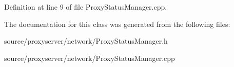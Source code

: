 Definition at line 9 of file Proxy\-Status\-Manager.\-cpp.



The documentation for this class was generated from the following files\-:\begin{DoxyCompactItemize}
\item 
source/proxyserver/network/Proxy\-Status\-Manager.\-h\item 
source/proxyserver/network/Proxy\-Status\-Manager.\-cpp\end{DoxyCompactItemize}
